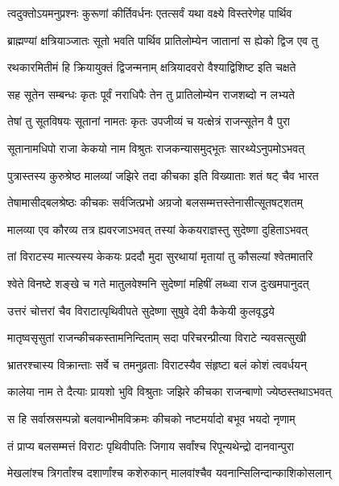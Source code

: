
\twolineshloka
{त्वदुक्तोऽयमनुप्रश्नः कुरूणां कीर्तिवर्धनः}
{एतत्सर्वं यथा वक्ष्ये विस्तरेणेह पार्थिव}


\twolineshloka
{ब्राह्मण्यां क्षत्रियाञ्जातः सूतो भवति पार्थिव}
{प्रातिलोम्येन जातानां स ह्येको द्विज एव तु}


\twolineshloka
{रथकारमितीमं हि क्रियायुक्तं द्विजन्मनाम्}
{क्षत्रियादवरो वैश्याद्विशिष्ट इति चक्षते}


\twolineshloka
{सह सूतेन सम्बन्धः कृतः पूर्वं नराधिपैः}
{तेन तु प्रातिलोम्येन राजशब्दो न लभ्यते}


\twolineshloka
{तेषां तु सूतविषयः सूतानां नामतः कृतः}
{उपजीव्यं च यत्क्षेत्रं राजन्सूतेन वै पुरा}


\twolineshloka
{सूतानामधिपो राजा केकयो नाम विश्रुतः}
{राजकन्यासमुद्भूतः सारथ्येऽनुपमोऽभवत्}


\twolineshloka
{पुत्रास्तस्य कुरुश्रेष्ठ मालव्यां जझिरे तदा}
{कीचका इति विख्याताः शतं षट् चैव भारत}


\twolineshloka
{तेषामासीद्बलश्रेष्ठः कीचकः सर्वजित्प्रभो}
{अग्रजो बलसम्मत्तस्तेनासीत्सूतषट्शतम्}


\twolineshloka
{मालव्या एव कौरव्य तत्र ह्यवरजाऽभवत्}
{तस्यां केकयराज्ञस्तु सुदेष्णा दुहिताऽभवत्}


\twolineshloka
{तां विराटस्य मात्स्यस्य केकयः प्रददौ मुदा}
{सुरथायां मृतायां तु कौसल्यां श्वेतमातरि}


\twolineshloka
{श्वेते विनष्टे शङ्खे च गते मातुलवेश्मनि}
{सुदेष्णां महिषीं लब्ध्वा राज दुःखमपानुदत्}


\twolineshloka
{उत्तरं चोत्तरां चैव विराटात्पृथिवीपते}
{सुदेष्णा सुषुवे देवी कैकेयी कुलवृद्धये}


\twolineshloka
{मातृष्वसृसुतां राजन्कीचकस्तामनिन्दिताम्}
{सदा परिचरन्प्रीत्या विराटे न्यवसत्सुखी}


\twolineshloka
{भ्रातरश्चास्य विक्रान्ताः सर्वे च तमनुव्रताः}
{विराटस्यैव संहृष्टा बलं कोशं त्ववर्धयन्}


\twolineshloka
{कालेया नाम ते दैत्याः प्रायशो भुवि विश्रुताः}
{जझिरे कीचका राजन्बाणो ज्येष्ठस्तथाऽभवत्}


\twolineshloka
{स हि सर्वास्रसम्पन्नो बलवान्भीमविक्रमः}
{कीचको नष्टमर्यादो बभूव भयदो नृणाम्}


\twolineshloka
{तं प्राप्य बलसम्मत्तं विराटः पृथिवीपतिः}
{जिगाय सर्वांश्च रिपून्यथेन्द्रो दानवान्पुरा}


\twolineshloka
{मेखलांश्च त्रिगर्तांश्च दशार्णांश्च कशेरुकान्}
{मालवांश्चैव यवनान्सिलिन्दान्काशिकोसलान्}


